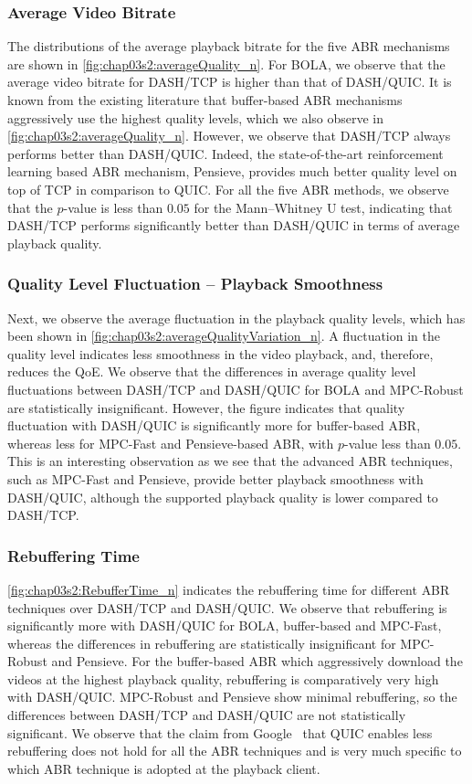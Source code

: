 \subsubsection{Average Video Bitrate}
The distributions of the average playback bitrate for the five \ac{ABR} mechanisms are shown in \fig\ref{fig:chap03s2:averageQuality_n}. For BOLA, we observe that the average video bitrate for DASH/TCP is higher than that of DASH/QUIC. It is known from the existing literature that buffer-based \ac{ABR} mechanisms aggressively use the highest quality levels, which we also observe in \fig\ref{fig:chap03s2:averageQuality_n}. However, we observe that DASH/TCP always performs better than DASH/QUIC. Indeed, the state-of-the-art reinforcement learning based \ac{ABR} mechanism, Pensieve, provides much better quality level on top of \ac{TCP} in comparison to \ac{QUIC}. For all the five \ac{ABR} methods, we observe that the $p$-value is less than $0.05$ for the Mann–Whitney U test, indicating that DASH/TCP performs significantly better than DASH/QUIC in terms of average playback quality.

\subsubsection{Quality Level Fluctuation -- Playback Smoothness}
Next, we observe the average fluctuation in the playback quality levels, which has been shown in \fig\ref{fig:chap03s2:averageQualityVariation_n}. A fluctuation in the quality level indicates less smoothness in the video playback, and, therefore, reduces the \ac{QoE}. We observe that the differences in average quality level fluctuations between DASH/TCP and DASH/QUIC for BOLA and MPC-Robust are statistically insignificant. However, the figure indicates that quality fluctuation with DASH/QUIC is significantly more for buffer-based \ac{ABR}, whereas less for MPC-Fast and Pensieve-based \ac{ABR}, with $p$-value less than $0.05$. This is an interesting observation as we see that the advanced \ac{ABR} techniques, such as MPC-Fast and Pensieve, provide better playback smoothness with DASH/QUIC, although the supported playback quality is lower compared to DASH/TCP.


\subsubsection{Rebuffering Time}
\fig\ref{fig:chap03s2:RebufferTime_n} indicates the rebuffering time for different \ac{ABR} techniques over DASH/TCP and DASH/QUIC. We observe that rebuffering is significantly more with DASH/QUIC for BOLA, buffer-based and MPC-Fast, whereas the differences in rebuffering are statistically insignificant for MPC-Robust and Pensieve. For the buffer-based \ac{ABR} which aggressively download the videos at the highest playback quality, rebuffering is comparatively very high with DASH/QUIC. MPC-Robust and Pensieve show minimal rebuffering, so the differences between DASH/TCP and DASH/QUIC are not statistically significant. We observe that the claim from Google~\cite{langley2017quic} that \ac{QUIC} enables less rebuffering does not hold for all the \ac{ABR} techniques and is very much specific to which \ac{ABR} technique is adopted at the playback client.



